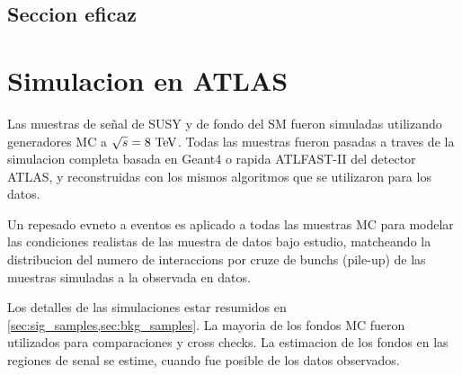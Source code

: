 
















\subsection{Seccion eficaz}










\section{Simulacion en ATLAS}

Las muestras de se\~nal de SUSY y de fondo del SM fueron simuladas utilizando generadores MC
a $\sqrt{s}=8\tev$.
Todas las muestras fueron pasadas a traves de la simulacion completa basada en Geant4\cite{Geant4,AtlasSim} o rapida
ATLFAST-II\cite{Richter-Was:683751} del detector ATLAS, y reconstruidas con los mismos algoritmos
que se utilizaron para los datos.

Un repesado evneto a eventos es aplicado a todas las muestras MC para modelar las condiciones
realistas de las muestra de datos bajo estudio, matcheando la distribucion del numero de interaccions
por cruze de bunchs (pile-up) de las muestras simuladas a la observada en datos.

Los detalles de las simulaciones estar resumidos en \cref{sec:sig_samples,sec:bkg_samples}.
La mayoria de los fondos MC fueron utilizados para comparaciones y cross checks.
La estimacion de los fondos en las regiones de senal se estime, cuando fue posible de los
datos observados.




